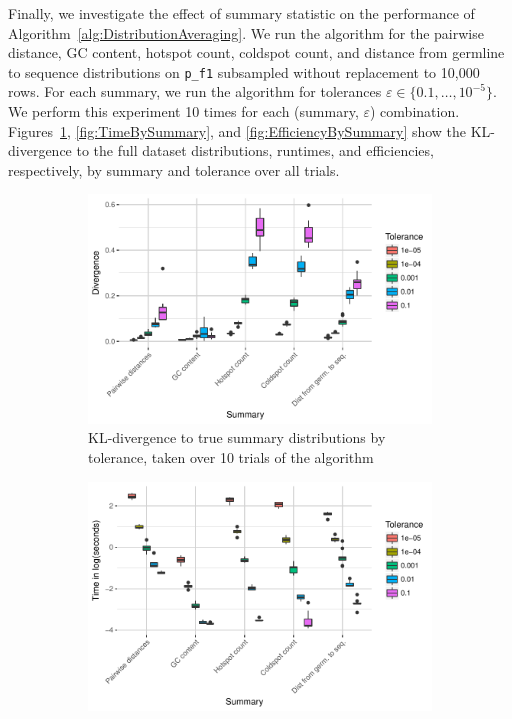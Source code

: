 \documentclass{article}
\begin{document}
Finally, we investigate the effect of summary statistic on the performance of Algorithm~\ref{alg:DistributionAveraging}.
We run the algorithm for the pairwise distance, GC content, hotspot count, coldspot count, and distance from germline to sequence distributions on \texttt{p\_f1} subsampled without replacement to 10,000 rows.
For each summary, we run the algorithm for tolerances $\varepsilon \in \{0.1, \dotsc, 10^{-5}\}$.
We perform this experiment 10 times for each (summary, $\varepsilon$) combination.
Figures~\ref{fig:DivBySummary}, \ref{fig:TimeBySummary}, and \ref{fig:EfficiencyBySummary} show the KL-divergence to the full dataset distributions, runtimes, and efficiencies, respectively, by summary and tolerance over all trials.
\begin{figure}
    \begin{subfigure}{0.49\textwidth}
        \includegraphics[width=\linewidth]{Figures/Multiple/div_by_summary_and_tol.pdf}
        \caption{KL-divergence to true summary distributions by tolerance, taken over 10 trials of the algorithm}
        \label{fig:DivBySummary}
    \end{subfigure}
    \begin{subfigure}{0.49\textwidth}
        \includegraphics[width=\linewidth]{Figures/Multiple/time_by_summary_and_tol.pdf}

\end{subfigure}
\end{figure}
\end{document}
